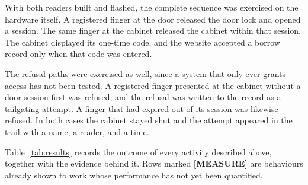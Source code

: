
With both readers built and flashed, the complete sequence was exercised on the
hardware itself. A registered finger at the door released the door lock and
opened a session. The same finger at the cabinet released the cabinet within
that session. The cabinet displayed its one-time code, and the website accepted
a borrow record only when that code was entered.

The refusal paths were exercised as well, since a system that only ever grants
access has not been tested. A registered finger presented at the cabinet without
a door session first was refused, and the refusal was written to the record as a
tailgating attempt. A finger that had expired out of its session was likewise
refused. In both cases the cabinet stayed shut and the attempt appeared in the
trail with a name, a reader, and a time.


Table~\ref{tab:results} records the outcome of every activity described above,
together with the evidence behind it. Rows marked \textbf{[MEASURE]} are
behaviours already shown to work whose performance has not yet been quantified.

